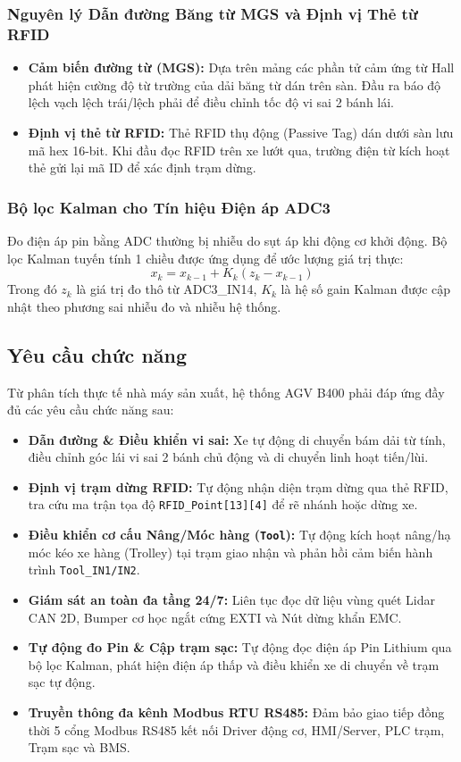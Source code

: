 \documentclass{article}
\begin{document}
\subsubsection{Nguyên lý Dẫn đường Băng từ MGS và Định vị Thẻ từ RFID}
\begin{itemize}
    \item \textbf{Cảm biến đường từ (MGS):} Dựa trên mảng các phần tử cảm ứng từ Hall phát hiện cường độ từ trường của dải băng từ dán trên sàn. Đầu ra báo độ lệch vạch lệch trái/lệch phải để điều chỉnh tốc độ vi sai 2 bánh lái.
    \item \textbf{Định vị thẻ từ RFID:} Thẻ RFID thụ động (Passive Tag) dán dưới sàn lưu mã hex 16-bit. Khi đầu đọc RFID trên xe lướt qua, trường điện từ kích hoạt thẻ gửi lại mã ID để xác định trạm dừng.
\end{itemize}

\subsubsection{Bộ lọc Kalman cho Tín hiệu Điện áp ADC3}
Đo điện áp pin bằng ADC thường bị nhiễu do sụt áp khi động cơ khởi động. Bộ lọc Kalman tuyến tính 1 chiều được ứng dụng để ước lượng giá trị thực:
\begin{equation}
    x_k = x_{k-1} + K_k (z_k - x_{k-1})
\end{equation}
Trong đó $z_k$ là giá trị đo thô từ ADC3\_IN14, $K_k$ là hệ số gain Kalman được cập nhật theo phương sai nhiễu đo và nhiễu hệ thống.

\subsection{Yêu cầu chức năng}
Từ phân tích thực tế nhà máy sản xuất, hệ thống AGV B400 phải đáp ứng đầy đủ các yêu cầu chức năng sau:
\begin{itemize}
    \item \textbf{Dẫn đường \& Điều khiển vi sai:} Xe tự động di chuyển bám dải từ tính, điều chỉnh góc lái vi sai 2 bánh chủ động và di chuyển linh hoạt tiến/lùi.
    \item \textbf{Định vị trạm dừng RFID:} Tự động nhận diện trạm dừng qua thẻ RFID, tra cứu ma trận tọa độ \texttt{RFID\_Point[13][4]} để rẽ nhánh hoặc dừng xe.
    \item \textbf{Điều khiển cơ cấu Nâng/Móc hàng (\texttt{Tool}):} Tự động kích hoạt nâng/hạ móc kéo xe hàng (Trolley) tại trạm giao nhận và phản hồi cảm biến hành trình \texttt{Tool\_IN1/IN2}.
    \item \textbf{Giám sát an toàn đa tầng 24/7:} Liên tục đọc dữ liệu vùng quét Lidar CAN 2D, Bumper cơ học ngắt cứng EXTI và Nút dừng khẩn EMC.
    \item \textbf{Tự động đo Pin \& Cập trạm sạc:} Tự động đọc điện áp Pin Lithium qua bộ lọc Kalman, phát hiện điện áp thấp và điều khiển xe di chuyển về trạm sạc tự động.
    \item \textbf{Truyền thông đa kênh Modbus RTU RS485:} Đảm bảo giao tiếp đồng thời 5 cổng Modbus RS485 kết nối Driver động cơ, HMI/Server, PLC trạm, Trạm sạc và BMS.
\end{itemize}
\end{document}
